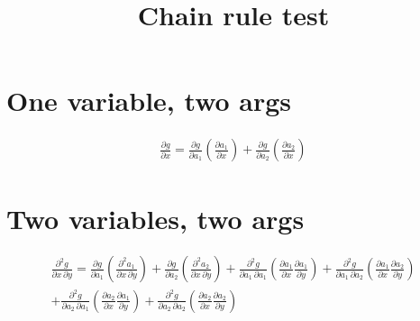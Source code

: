 \documentclass[letter]{article}
\title{Chain rule test}
\begin{document}
    
\section{One variable, two args}
\begin{multline*}
\frac{\partial g}{\partial x} =
\frac{\partial g}{\partial a_1}
\left(
\frac{\partial a_1}{\partial x}
\right)
+
\frac{\partial g}{\partial a_2}
\left(
\frac{\partial a_2}{\partial x}
\right)
\end{multline*}
\section{Two variables, two args}
\begin{multline*}
\frac{\partial^2 g}{\partial x\,\partial y} =
\frac{\partial g}{\partial a_1}
\left(
\frac{\partial^2 a_1}{\partial x\,\partial y}
\right)
+
\frac{\partial g}{\partial a_2}
\left(
\frac{\partial^2 a_2}{\partial x\,\partial y}
\right)
+
\frac{\partial^2 g}{\partial a_1\,\partial a_1}
\left(
\frac{\partial a_1}{\partial x}
\frac{\partial a_1}{\partial y}
\right)
+
\frac{\partial^2 g}{\partial a_1\,\partial a_2}
\left(
\frac{\partial a_1}{\partial x}
\frac{\partial a_2}{\partial y}
\right)
\\
+
\frac{\partial^2 g}{\partial a_2\,\partial a_1}
\left(
\frac{\partial a_2}{\partial x}
\frac{\partial a_1}{\partial y}
\right)
+
\frac{\partial^2 g}{\partial a_2\,\partial a_2}
\left(
\frac{\partial a_2}{\partial x}
\frac{\partial a_2}{\partial y}
\right)
\end{multline*}
\end{document}
